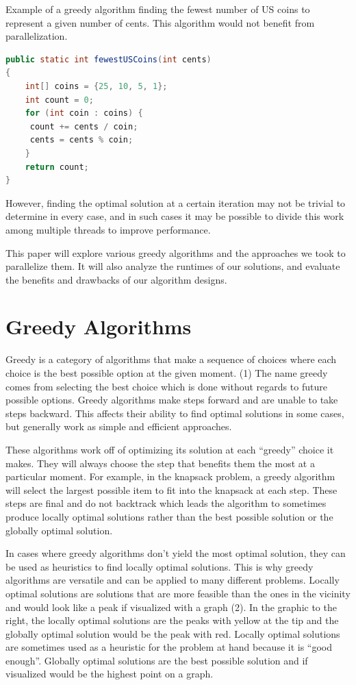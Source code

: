 \documentclass[letterpaper, 10 pt, conference]{ieeeconf}  %
\begin{document}
\caption{Example of a greedy algorithm finding the fewest number of US coins to represent a given number of cents. This algorithm would not benefit from parallelization.}
\begin{lstlisting}[language=Java]
public static int fewestUSCoins(int cents) 
{
    int[] coins = {25, 10, 5, 1};
    int count = 0;
    for (int coin : coins) {
   	 count += cents / coin;
   	 cents = cents % coin;
    }
    return count;
}
\end{lstlisting}

However, finding the optimal solution at a certain iteration may not be trivial to determine in every case, and in such cases it may be possible to divide this work among multiple threads to improve performance.

This paper will explore various greedy algorithms and the approaches we took to parallelize them. It will also analyze the runtimes of our solutions, and evaluate the benefits and drawbacks of our algorithm designs.

\section{Greedy Algorithms}
Greedy is a category of algorithms that make a sequence of choices where each choice is the best possible option at the given moment. (1) The name greedy comes from selecting the best choice which is done without regards to future possible options. Greedy algorithms make steps forward and are unable to take steps backward. This affects their ability to find optimal solutions in some cases, but generally work as simple and efficient approaches.

These algorithms work off of optimizing its solution at each “greedy” choice it makes. They will always choose the step that benefits them the most at a particular moment. For example, in the knapsack problem, a greedy algorithm will select the largest possible item to fit into the knapsack at each step. These steps are final and do not backtrack which leads the algorithm to sometimes produce locally optimal solutions rather than the best possible solution or the globally optimal solution.

In cases where greedy algorithms don’t yield the most optimal solution, they can be used as heuristics to find locally optimal solutions. This is why greedy algorithms are versatile and can be applied to many different problems. Locally optimal solutions are solutions that are more feasible than the ones in the vicinity and would look like a peak if visualized with a graph (2). In the graphic to the right, the locally optimal solutions are the peaks with yellow at the tip and the globally optimal solution would be the peak with red. Locally optimal solutions are sometimes used as a heuristic for the problem at hand because it is “good enough”. Globally optimal solutions are the best possible solution and if visualized would be the highest point on a graph.
\end{document}
